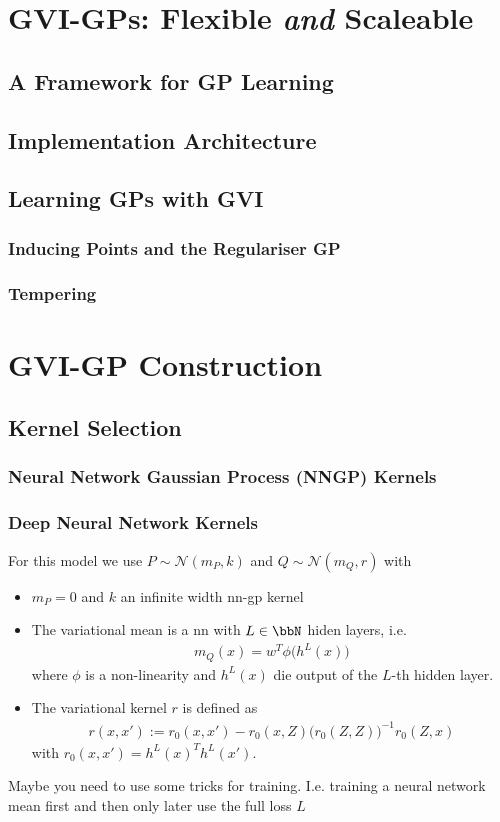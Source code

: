 \documentclass{article}
\numberwithin{equation}{section}
\begin{document}
\newpage
\section{GVI-GPs: Flexible \textit{and} Scaleable}
\subsection{A Framework for GP Learning}
\subsection{Implementation Architecture}
\subsection{Learning GPs with GVI}
\subsubsection{Inducing Points and the Regulariser GP}
\subsubsection{Tempering}


\newpage
\section{GVI-GP Construction}
\subsection{Kernel Selection}
\subsubsection{Neural Network Gaussian Process (NNGP) Kernels}
\subsubsection{Deep Neural Network Kernels}
For this model we use $P \sim \mathcal{N}(m_P, k) $ and $Q \sim \mathcal{N}(m_Q, r)$ with 
\begin{itemize}
    \item $m_P = 0$ and $k$ an infinite width nn-gp kernel
    \item The variational mean is a nn with $L \in \bbN$ hiden layers, i.e. 
    \begin{align}
        m_Q(x) = w^T \phi\big( h^{L}(x) \big)
    \end{align}
    where $\phi$ is a non-linearity and $h^L(x)$ die output of the $L$-th hidden layer. 
    \item 
    The variational kernel $r$ is defined as 
    \begin{align}
        r(x,x') := r_0(x,x') - r_0(x,Z) \big( r_0(Z,Z) \big)^{-1} r_0(Z,x)
    \end{align}
    with $r_0(x,x') = h^{L}(x)^T h^{L}(x')$.
\end{itemize}
Maybe you need to use some tricks for training. I.e. training a neural network mean first and then only later use the full loss $L$
\end{document}
